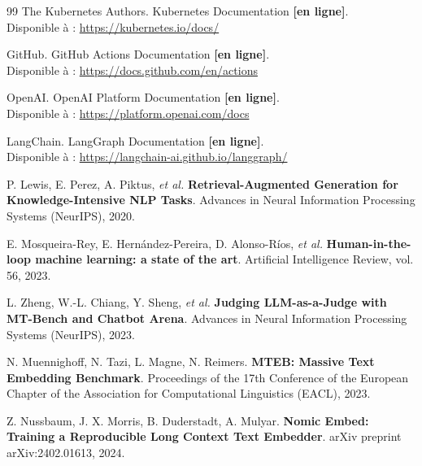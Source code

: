 \begin{thebibliography}{99}
The Kubernetes Authors. Kubernetes Documentation \textbf{[en ligne]}.\\Disponible à :
\url{https://kubernetes.io/docs/}

GitHub. GitHub Actions Documentation \textbf{[en ligne]}.\\Disponible à :
\url{https://docs.github.com/en/actions}

OpenAI. OpenAI Platform Documentation \textbf{[en ligne]}.\\Disponible à :
\url{https://platform.openai.com/docs}

LangChain. LangGraph Documentation \textbf{[en ligne]}.\\Disponible à :
\url{https://langchain-ai.github.io/langgraph/}

P. Lewis, E. Perez, A. Piktus, \textit{et al.} \textbf{Retrieval-Augmented Generation for
Knowledge-Intensive NLP Tasks}. Advances in Neural Information Processing Systems (NeurIPS),
2020.

E. Mosqueira-Rey, E. Hernández-Pereira, D. Alonso-Ríos, \textit{et al.} \textbf{Human-in-the-loop
machine learning: a state of the art}. Artificial Intelligence Review, vol. 56, 2023.

L. Zheng, W.-L. Chiang, Y. Sheng, \textit{et al.} \textbf{Judging LLM-as-a-Judge with
MT-Bench and Chatbot Arena}. Advances in Neural Information Processing Systems (NeurIPS),
2023.

N. Muennighoff, N. Tazi, L. Magne, N. Reimers. \textbf{MTEB: Massive Text Embedding
Benchmark}. Proceedings of the 17th Conference of the European Chapter of the Association
for Computational Linguistics (EACL), 2023.

Z. Nussbaum, J. X. Morris, B. Duderstadt, A. Mulyar. \textbf{Nomic Embed: Training a
Reproducible Long Context Text Embedder}. arXiv preprint arXiv:2402.01613, 2024.

\end{thebibliography}
